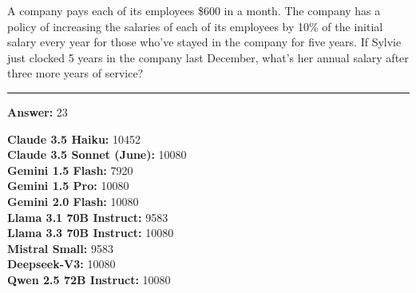 \begin{tcolorbox}[colback=gray!3, colframe=gray!50, arc=2mm, boxrule=0.5pt, title={\textit{GSM8K}}, coltitle=black, colbacktitle=gray!20]    
    A company pays each of its employees \$600 in a month. The company has a policy of increasing the salaries of each of its employees by 10\% of the initial salary every year for those who've stayed in the company for five years. If Sylvie just clocked 5 years in the company last December, what's her annual salary after three more years of service?
    \noindent
    \begin{center}
        \rule{0.9\textwidth}{0.4pt}
    \end{center}
    
    \textbf{Answer:} 23
    
    \medskip
    
    \textbf{Claude 3.5 Haiku:} 10452 \\
    \textbf{Claude 3.5 Sonnet (June):} 10080 \\
    \textbf{Gemini 1.5 Flash:} 7920 \\
    \textbf{Gemini 1.5 Pro:} 10080 \\
    \textbf{Gemini 2.0 Flash:} 10080 \\
    \textbf{Llama 3.1 70B Instruct:} 9583 \\
    \textbf{Llama 3.3 70B Instruct:} 10080 \\
    \textbf{Mistral Small:} 9583 \\
    \textbf{Deepseek-V3:} 10080 \\
    \textbf{Qwen 2.5 72B Instruct:} 10080 \\
    

\end{tcolorbox}
\vspace{\baselineskip}

